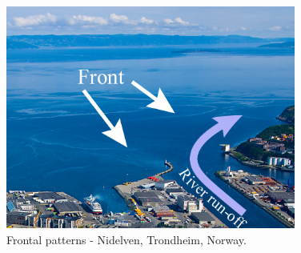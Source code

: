 \documentclass[aoas]{imsart}
\begin{document}
\begin{figure}[!h] 
\centering 
\includegraphics[width=0.85\textwidth]{Figures/pictures/c-updated.pdf}
\caption{Frontal patterns - Nidelven, Trondheim, Norway.}
\label{fig:nidelven}
\end{figure}

\end{document}
